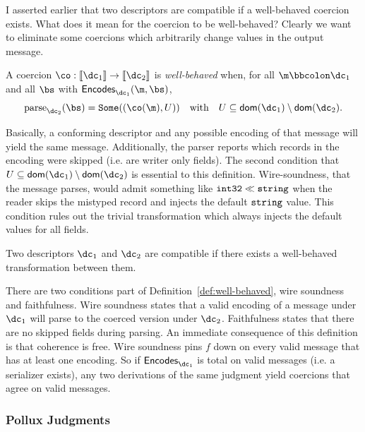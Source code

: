 I asserted earlier that two descriptors are compatible if a well-behaved
coercion exists. What does it mean for the coercion to be well-behaved? Clearly
we want to eliminate some coercions which arbitrarily change values in the
output message.

\vspace{1em}
\begin{definition}\label{def:well-behaved}
  A coercion $\co : \denote{\dc_1} \to \denote{\dc_2}$ is \emph{well-behaved} when,
  for all $\validv{\m}{\dc_1}$ and all $\bs$ with $\encodes{\dc_1}(\m, \bs)$,
  \[ \mathrm{parse}_{\dc_2}(\bs) = \some{(\co(\m), U)} \quad\text{with}\quad
    U \subseteq \dom{\dc_1} \setminus \dom{\dc_2}. \]
\end{definition}

Basically, a conforming descriptor and any possible encoding of that message
will yield the same message. Additionally, the parser reports which records in
the encoding were skipped (i.e. are writer only fields). The second condition
that $U \subseteq \dom{\dc_1} \setminus \dom{\dc_2}$ is essential to this
definition. Wire-soundness, that the message parses, would admit something like
$\texttt{int32} \ll \texttt{string}$ when the reader skips the mistyped record and injects
the default $\texttt{string}$ value. This condition rules out the trivial transformation
which always injects the default values for all fields.

\vspace{1em}
\begin{definition}[Compatibility]\label{def:compat}
  Two descriptors $\dc_1$ and $\dc_2$ are compatible if there exists a well-behaved
  transformation between them. 
\end{definition}

There are two conditions part of Definition~\ref{def:well-behaved}, wire
soundness and faithfulness. Wire soundness states that a valid encoding of a
message under $\dc_1$ will parse to the coerced version under $\dc_2$. Faithfulness
states that there are no skipped fields during parsing.  An immediate
consequence of this definition is that coherence is free. Wire soundness pins
$f$ down on every valid message that has at least one encoding. So if
$\encodes{\dc_1}$ is total on valid messages (i.e. a serializer exists), any two
derivations of the same judgment yield coercions that agree on valid messages.

\subsubsection{Pollux Judgments}\label{sec:judgments}

